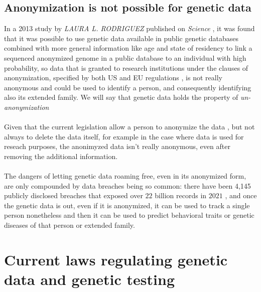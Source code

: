 \documentclass[12pt]{article}
\begin{document}
\subsection{Anonymization is not possible for genetic data}
In a 2013 study by \emph{LAURA L. RODRIGUEZ} published on \emph{Science} \cite{anonymization}, it was found that it was possible to use genetic data available in public genetic databases combined with more 
general information like age and state of residency to link a sequenced anonymized genome in a public database to an individual with high probability, so 
data that is granted to research institutions under the clauses of anonymization, specified by both US and EU regulations \cite{genetic_discrimination}\cite{genetic_discrimination_GINA}\cite{genetic_data_misuse}, is not really anonymous and could be used to identify a 
person, and consequently identifying also its extended family. We will say that genetic data holds the property of \emph{un-anonymization} \\
\\
Given that the current legislation allow a person to anonymize the data \cite{genetic_data_misuse}\cite{genetic_discrimination}, but not always to delete the data itself, for example in the case where data is used for reseach purposes, 
 the anonimyzed data isn't really anonymous, even after removing the additional information.\\
\\
The dangers of letting genetic data roaming free, even in its anonymized form, are only compounded by data breaches being so common: 
there have been 4,145 publicly disclosed breaches that exposed over $22$ billion records in $2021$ \cite{data_breaches}, and once the genetic data is out, even if it is anonymized, 
it can be used to track a single person nonetheless and then it can be used to predict behavioral traits or genetic diseases of that person or extended family.

\newpage
\section{Current laws regulating genetic data and genetic testing}
\label{sec:legal}
\end{document}
